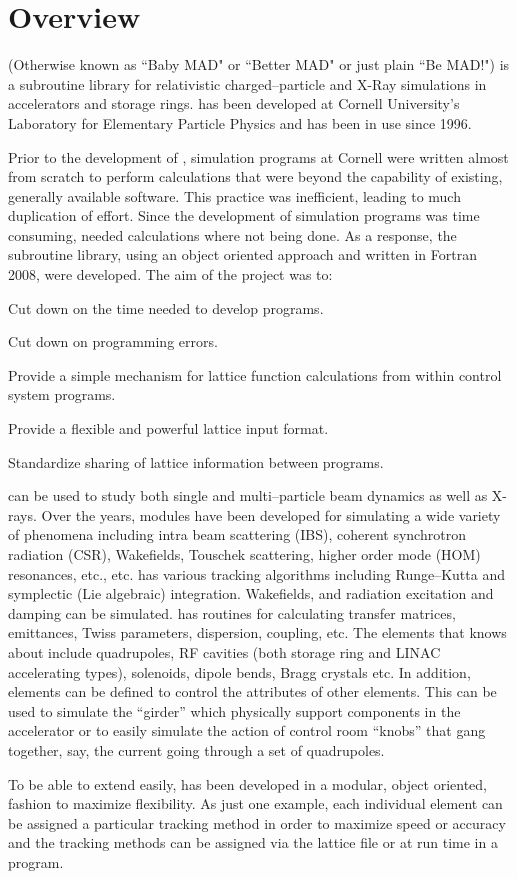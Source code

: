 \section*{Overview}

\bmad (Otherwise known as ``Baby MAD" or ``Better MAD" or just plain ``Be MAD!") is a subroutine
library for relativistic charged--particle and X-Ray simulations in accelerators and storage
rings. \bmad has been developed at Cornell University's Laboratory for Elementary Particle Physics
and has been in use since 1996.

Prior to the development of \bmad, simulation programs at Cornell were written almost from scratch
to perform calculations that were beyond the capability of existing, generally available
software. This practice was inefficient, leading to much duplication of effort.  Since the
development of simulation programs was time consuming, needed calculations where not being done.  As
a response, the \bmad subroutine library, using an object oriented approach and written in Fortran
2008, were developed.  The aim of the \bmad project was to:
\begin{Itemize}
\item Cut down on the time needed to develop programs.
\item Cut down on programming errors.
\item Provide a simple mechanism for lattice function calculations
from within control system programs.
\item Provide a flexible and powerful lattice input format.
\item Standardize sharing of lattice information between 
programs.
\end{Itemize}

\bmad can be used to study both single and multi--particle beam dynamics as well as X-rays.  Over
the years, \bmad modules have been developed for simulating a wide variety of phenomena including
intra beam scattering (IBS), coherent synchrotron radiation (CSR), Wakefields, Touschek scattering,
higher order mode (HOM) resonances, etc., etc.  \bmad has various tracking algorithms including
Runge--Kutta and symplectic (Lie algebraic) integration. Wakefields, and radiation excitation and
damping can be simulated. \bmad has routines for calculating transfer matrices, emittances, Twiss
parameters, dispersion, coupling, etc. The elements that \bmad knows about include quadrupoles, RF
cavities (both storage ring and LINAC accelerating types), solenoids, dipole bends, Bragg crystals
etc.  In addition, elements can be defined to control the attributes of other elements. This can be
used to simulate the ``girder'' which physically support components in the accelerator or to easily
simulate the action of control room ``knobs'' that gang together, say, the current going through a
set of quadrupoles.

To be able to extend \bmad easily, \bmad has been developed in a modular, object oriented, fashion
to maximize flexibility. As just one example, each individual element can be assigned a particular
tracking method in order to maximize speed or accuracy and the tracking methods can be assigned via
the lattice file or at run time in a program.

\vfill
\break

